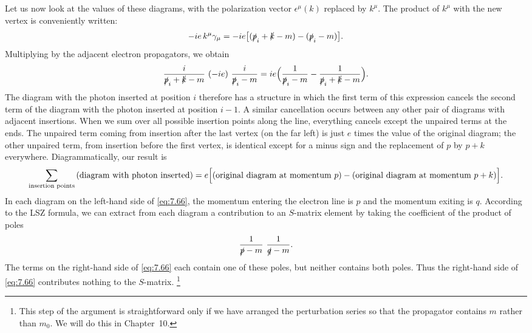 Let us now look at the values of these diagrams, with the polarization vector
$\epsilon^\mu(k)$ replaced by $k^\mu$.  The product of $k^\mu$ with the new
vertex is conveniently written:
\begin{equation}
  -ie\,k^\mu\gamma_\mu = -ie\bigl[ (\slashed{p}_i+\slashed{k}-m)
    - (\slashed{p}_i-m) \bigr] .
  \label{eq:7.65}
\end{equation}
Multiplying by the adjacent electron propagators, we obtain
\begin{equation}
  \frac{i}{\slashed{p}_i+\slashed{k}-m}\ (-ie)\ \frac{i}{\slashed{p}_i-m}
  = ie\Bigl( \frac{1}{\slashed{p}_i-m}
    - \frac{1}{\slashed{p}_i+\slashed{k}-m} \Bigr) .
\end{equation}
The diagram with the photon inserted at position $i$ therefore has a structure
in which the first term of this expression cancels the second term of the
diagram with the photon inserted at position $i-1$.  A similar cancellation
occurs between any other pair of diagrams with adjacent insertions.  When we
sum over all possible insertion points along the line, everything cancels
except the unpaired terms at the ends.  The unpaired term coming from
insertion after the last vertex (on the far left) is just $e$ times the value
of the original diagram; the other unpaired term, from insertion before the
first vertex, is identical except for a minus sign and the replacement of $p$
by $p+k$ everywhere.  Diagrammatically, our result is
\begin{equation}
  \sum_{\text{insertion points}} \text{(diagram with photon inserted)}
  = e\Bigl[ \text{(original diagram at momentum }p\text{)}
    - \text{(original diagram at momentum }p+k\text{)} \Bigr].
  \label{eq:7.66}
\end{equation}
In each diagram on the left-hand side of \eqref{eq:7.66}, the momentum
entering the electron line is $p$ and the momentum exiting is $q$.  According
to the LSZ formula, we can extract from each diagram a contribution to an
$S$-matrix element by taking the coefficient of the product of poles
\begin{equation}
  \frac{1}{\slashed{p}-m}\ \frac{1}{\slashed{q}-m} .
\end{equation}
The terms on the right-hand side of \eqref{eq:7.66} each contain one of these
poles, but neither contains both poles.  Thus the right-hand side of
\eqref{eq:7.66} contributes nothing to the $S$-matrix.%
\footnote{This step of the argument is straightforward only if we have
arranged the perturbation series so that the propagator contains $m$ rather
than $m_0$.  We will do this in Chapter~10.}

